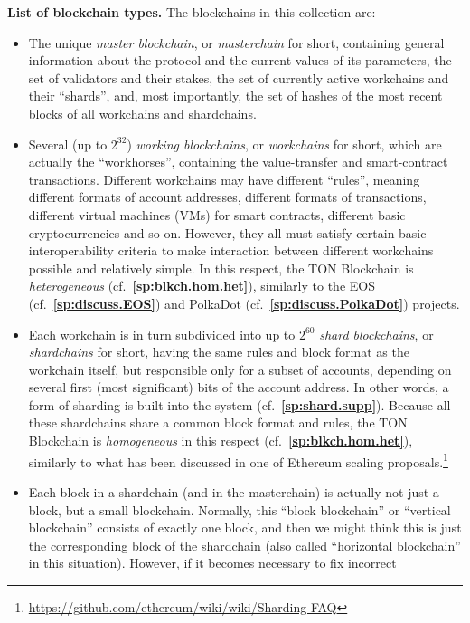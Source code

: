 \documentclass[12pt,oneside]{article}
\def\makepoint#1{\medbreak\noindent{\bf #1.\ }}
\def\nxsubpoint{\refstepcounter{subsubsection}%
  \smallbreak\makepoint{\thesubsubsection}}
\def\refpoint#1{{\rm\textbf{\ref{#1}}}}
\let\ptref=\refpoint
\def\embt(#1.){\textbf{#1.}}
\begin{document}
\nxsubpoint\label{sp:list.blkch.typ}
\embt(List of blockchain types.) The blockchains in this collection
are:
\begin{itemize}
\item The unique {\em master blockchain}, or {\em masterchain\/} for
  short, containing general information about the protocol and the
  current values of its parameters, the set of validators and their
  stakes, the set of currently active workchains and their ``shards'',
  and, most importantly, the set of hashes of the most recent blocks
  of all workchains and shardchains.
\item Several (up to $2^{32}$) {\em working blockchains}, or {\em
  workchains\/} for short, which are actually the ``workhorses'',
  containing the value-transfer and smart-contract
  transactions. Different workchains may have different ``rules'',
  meaning different formats of account addresses, different formats of
  transactions, different virtual machines (VMs) for smart contracts,
  different basic cryptocurrencies and so on. However, they all must
  satisfy certain basic interoperability criteria to make interaction
  between different work\-chains possible and relatively simple. In
  this respect, the TON Blockchain is {\em heterogeneous\/}
  (cf.~\ptref{sp:blkch.hom.het}), similarly to the EOS
  (cf.~\ptref{sp:discuss.EOS}) and PolkaDot
  (cf.~\ptref{sp:discuss.PolkaDot}) projects.
\item Each workchain is in turn subdivided into up to $2^{60}$ {\em
  shard blockchains}, or {\em shardchains\/} for short, having the
  same rules and block format as the workchain itself, but responsible
  only for a subset of accounts, depending on several first (most
  significant) bits of the account address. In other words, a form of
  sharding is built into the system
  (cf.~\ptref{sp:shard.supp}). Because all these shardchains share a
  common block format and rules, the TON Blockchain is {\em
    homogeneous\/} in this respect (cf.~\ptref{sp:blkch.hom.het}),
  similarly to what has been discussed in one of Ethereum scaling
  proposals.\footnote{\url{https://github.com/ethereum/wiki/wiki/Sharding-FAQ}}
\item Each block in a shardchain (and in the masterchain) is actually
  not just a block, but a small blockchain. Normally, this ``block
  blockchain'' or ``vertical blockchain'' consists of exactly one
  block, and then we might think this is just the corresponding block
  of the shardchain (also called ``horizontal block\-chain'' in this
  situation). However, if it becomes necessary to fix incorrect

\end{itemize}
\end{document}
